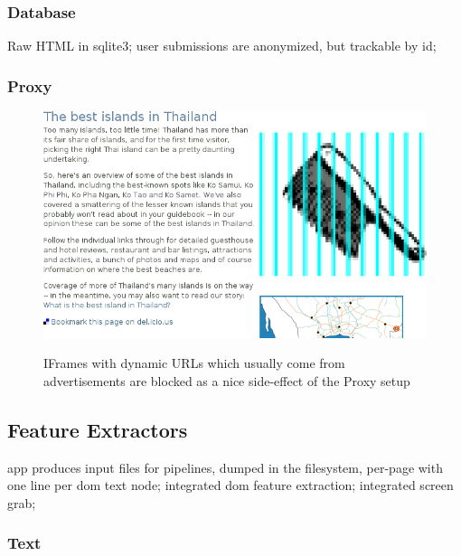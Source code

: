 \subsubsection{Database}

Raw HTML in sqlite3;
user submissions are anonymized, but trackable by id;

\subsubsection{Proxy}

\begin{figure}
	{\includegraphics[width=\textwidth]{add}}
\caption{IFrames with dynamic URLs which usually come from advertisements are blocked as a nice side-effect of the Proxy setup}
\end{figure}

\subsection{Feature Extractors}

app produces input files for pipelines, dumped in the filesystem, per-page with one line per dom text node;
integrated dom feature extraction;
integrated screen grab;

\subsubsection{Text}

